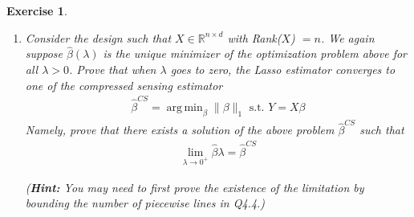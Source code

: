 \documentclass[12pt]{article}
\DeclareMathOperator*{\argmin}{arg\,min}
\theoremstyle{colon}
\newtheorem{exercise}{Exercise}
\begin{document}
\begin{exercise}
\begin{enumerate}[label=\arabic*)]
      (\textbf{Hint:} Use Q4.2. You may need the Moore-Penrose pseudoinverse. Given a SVD of rank $r$ matrix $A = U \Lambda V^T \in \mathbb{R}^{n \times d}$, where $U \in \mathbb{R}^{n \times r}$, $V \in \mathbb{R}^{d \times r}$. The pseudoinverse of $A$ is $A^\dagger = V \Lambda^{-1} U^T$.)

    \item Consider the design such that $X \in \mathbb{R}^{n \times d}$ with Rank($X$) $= n$. We again suppose $\widehat{\beta}(\lambda)$ is the unique minimizer of the optimization problem above for all $\lambda > 0$. Prove that when $\lambda$ goes to zero, the Lasso estimator converges to one of the compressed sensing estimator
      \begin{gather*}
        \widehat{\beta}^{CS} = \argmin_{\beta} \lVert \beta \rVert_1 \text{ s.t. } Y = X \beta
      \end{gather*}
      Namely, prove that there exists a solution of the above problem $\widehat{\beta}^{CS}$ such that
      \begin{gather*}
        \lim_{\lambda \rightarrow 0^+} \widehat{\beta}{\lambda} = \widehat{\beta}^{CS}
      \end{gather*}

      (\textbf{Hint:} You may need to first prove the existence of the limitation by bounding the number of piecewise lines in Q4.4.)
  \end{enumerate}
\end{exercise}
\end{document}
